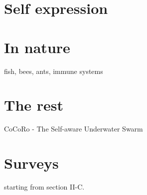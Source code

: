 \documentclass{article}
\begin{document}
	\section{Self expression}
	\citet{lewis-2011-a-survey-of-self-awareness-and-its-application-in-computing-systems}
	\section{In nature}
	 fish, bees, ants, immune systems	
	\section{The rest}
	\cite{kernbach-2011-awareness-and-self-awareness-for-multi-robot-organisms}
	\cite{selvaggio-2017-towards-a-self-collision-aware-teleoperation-framework-for-compound-robots}
	\cite{celentano-2016-multi-robot-systems-machine-machine-and-human-machine-interaction-and-their-modelling}
	CoCoRo - The Self-aware Underwater Swarm \cite{schmickl-2011-cocoro-the-self-aware-underwater-swarm}
	\section{Surveys}
	\cite{lewis-2011-a-survey-of-self-awareness-and-its-application-in-computing-systems} starting from section II-C.
	
\end{document}
